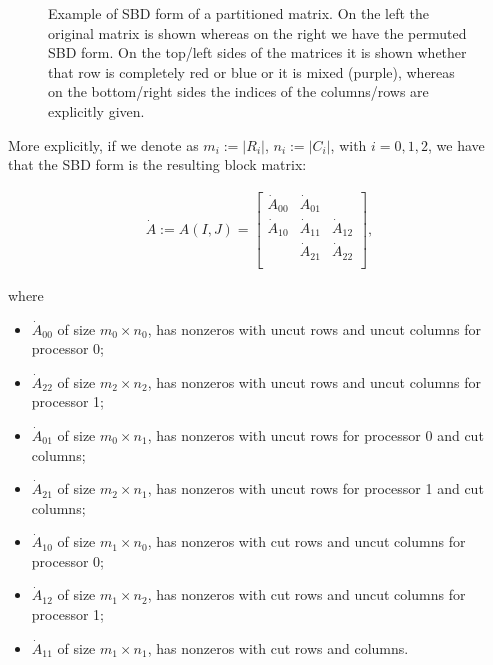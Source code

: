 \begin{figure}[h]
	\caption{Example of SBD form of a partitioned matrix. On the left the original matrix is shown whereas on the right we have the permuted SBD form. On the top/left sides of the matrices it is shown whether that row is completely red or blue or it is mixed (purple), whereas on the bottom/right sides the indices of the columns/rows are explicitly given.} \label{fig:sbd}
\end{figure}

More explicitly, if we denote as $m_i := |R_i|$, $n_i := |C_i|$, with $i=0,1,2$, we have that the SBD form is the resulting block matrix:

\begin{align}\dot{A} := A(I,J) = 
	\begin{bmatrix}
		\dot{A}_{00} & \dot{A}_{01}  & \\
		\dot{A}_{10} & \dot{A}_{11} & \dot{A}_{12} \\
		& \dot{A}_{21} & \dot{A}_{22} \\ 
	\end{bmatrix}, \label{eq:sbd}
\end{align}

where

\begin{itemize}
	\item $\dot{A}_{00}$ of size $m_0 \times n_0$, has nonzeros with uncut rows and uncut columns for processor 0;
	\item $\dot{A}_{22}$ of size $m_2 \times n_2$, has nonzeros with uncut rows and uncut columns for processor 1;
	\item $\dot{A}_{01}$ of size $m_0 \times n_1$, has nonzeros with uncut rows for processor 0 and cut columns;
	\item $\dot{A}_{21}$ of size $m_2 \times n_1$, has nonzeros with uncut rows for processor 1 and cut columns;
	\item $\dot{A}_{10}$ of size $m_1 \times n_0$, has nonzeros with cut rows and uncut columns for processor 0;
	\item $\dot{A}_{12}$ of size $m_1 \times n_2$, has nonzeros with cut rows and uncut columns for processor 1;
	\item $\dot{A}_{11}$ of size $m_1 \times n_1$, has nonzeros with cut rows and columns.
\end{itemize}

